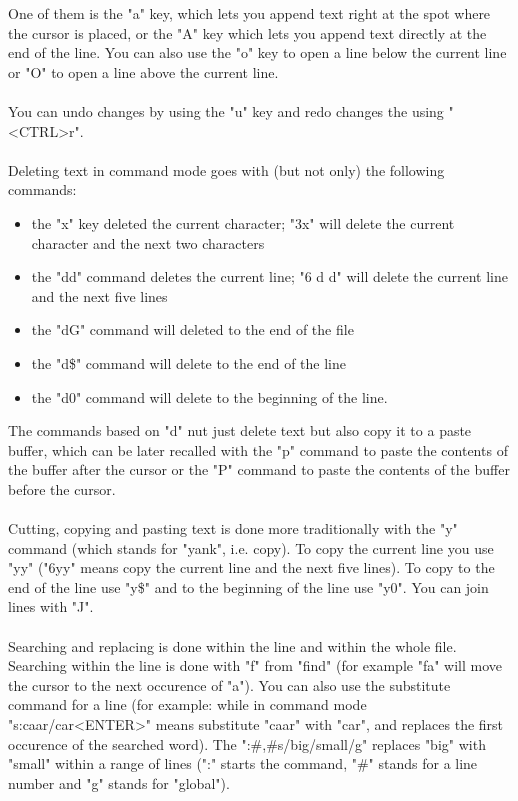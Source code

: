 \documentclass {article}
\begin{document}
One of them is the "a" key, which lets you append text right at the spot where the cursor is placed, or the "A" key which lets you append text directly at the end of the line.
 You can also use the "o" key to open a line below the current line or "O" to open a line above the current line.
\\ 
\\
You can undo changes by using the "u" key and redo changes the using "<CTRL>r".
\\
\\   
Deleting text in command mode goes with (but not only) the following commands:
\begin{itemize}
\item the "x" key deleted the current character; "3x" will delete the current character and the next two characters
\item the "dd" command deletes the current line; "6 d d" will delete the current line and the next five lines
\item the "dG" command will deleted to the end of the file
\item the "d\$" command will delete to the end of the line
\item the "d0" command will delete to the beginning of the line.
\end{itemize}
The commands based on "d" nut just delete text but also copy it to a paste buffer, which can be later recalled with the "p" command to paste the contents of the buffer after the cursor or the "P" command to paste the contents of the buffer before the cursor.
\\
\\
Cutting, copying and pasting text is done more traditionally with the "y" command (which stands for "yank", i.e. copy). 
To copy the current line you use "yy" ("6yy" means copy the current line and the next five lines). To copy to the end of the line use "y\$" and to the beginning of the line use "y0". You can join lines with "J".
\\
\\
Searching and replacing is done within the line and within the whole file. 
Searching within the line is done with "f" from "find" (for example "fa" will move the cursor to the next occurence of "a"). 
You can also use the substitute command for a line (for example: while in command mode "s:caar/car<ENTER>" means substitute "caar" with "car", and replaces the first occurence of the searched word). 
The ":\#,\#s/big/small/g" replaces "big" with "small" within a range of lines (":" starts the command, "\#" stands for a line number and "g" stands for "global"). 
\end{document}
